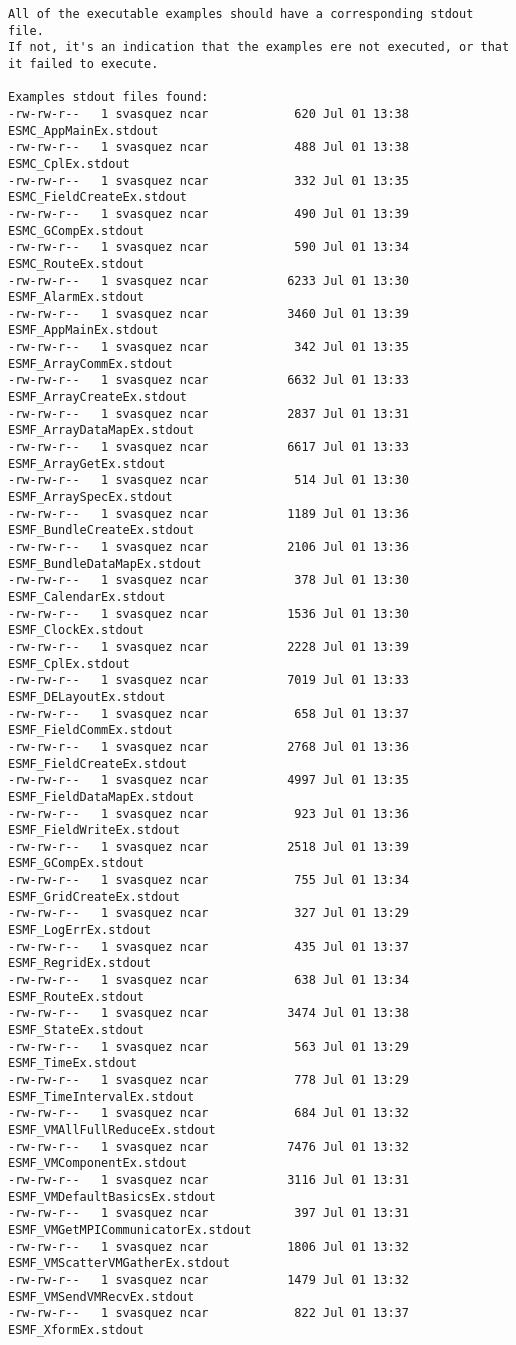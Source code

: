 \begin{verbatim}
All of the executable examples should have a corresponding stdout file.
If not, it's an indication that the examples ere not executed, or that it failed to execute.

Examples stdout files found: 
-rw-rw-r--   1 svasquez ncar            620 Jul 01 13:38 ESMC_AppMainEx.stdout
-rw-rw-r--   1 svasquez ncar            488 Jul 01 13:38 ESMC_CplEx.stdout
-rw-rw-r--   1 svasquez ncar            332 Jul 01 13:35 ESMC_FieldCreateEx.stdout
-rw-rw-r--   1 svasquez ncar            490 Jul 01 13:39 ESMC_GCompEx.stdout
-rw-rw-r--   1 svasquez ncar            590 Jul 01 13:34 ESMC_RouteEx.stdout
-rw-rw-r--   1 svasquez ncar           6233 Jul 01 13:30 ESMF_AlarmEx.stdout
-rw-rw-r--   1 svasquez ncar           3460 Jul 01 13:39 ESMF_AppMainEx.stdout
-rw-rw-r--   1 svasquez ncar            342 Jul 01 13:35 ESMF_ArrayCommEx.stdout
-rw-rw-r--   1 svasquez ncar           6632 Jul 01 13:33 ESMF_ArrayCreateEx.stdout
-rw-rw-r--   1 svasquez ncar           2837 Jul 01 13:31 ESMF_ArrayDataMapEx.stdout
-rw-rw-r--   1 svasquez ncar           6617 Jul 01 13:33 ESMF_ArrayGetEx.stdout
-rw-rw-r--   1 svasquez ncar            514 Jul 01 13:30 ESMF_ArraySpecEx.stdout
-rw-rw-r--   1 svasquez ncar           1189 Jul 01 13:36 ESMF_BundleCreateEx.stdout
-rw-rw-r--   1 svasquez ncar           2106 Jul 01 13:36 ESMF_BundleDataMapEx.stdout
-rw-rw-r--   1 svasquez ncar            378 Jul 01 13:30 ESMF_CalendarEx.stdout
-rw-rw-r--   1 svasquez ncar           1536 Jul 01 13:30 ESMF_ClockEx.stdout
-rw-rw-r--   1 svasquez ncar           2228 Jul 01 13:39 ESMF_CplEx.stdout
-rw-rw-r--   1 svasquez ncar           7019 Jul 01 13:33 ESMF_DELayoutEx.stdout
-rw-rw-r--   1 svasquez ncar            658 Jul 01 13:37 ESMF_FieldCommEx.stdout
-rw-rw-r--   1 svasquez ncar           2768 Jul 01 13:36 ESMF_FieldCreateEx.stdout
-rw-rw-r--   1 svasquez ncar           4997 Jul 01 13:35 ESMF_FieldDataMapEx.stdout
-rw-rw-r--   1 svasquez ncar            923 Jul 01 13:36 ESMF_FieldWriteEx.stdout
-rw-rw-r--   1 svasquez ncar           2518 Jul 01 13:39 ESMF_GCompEx.stdout
-rw-rw-r--   1 svasquez ncar            755 Jul 01 13:34 ESMF_GridCreateEx.stdout
-rw-rw-r--   1 svasquez ncar            327 Jul 01 13:29 ESMF_LogErrEx.stdout
-rw-rw-r--   1 svasquez ncar            435 Jul 01 13:37 ESMF_RegridEx.stdout
-rw-rw-r--   1 svasquez ncar            638 Jul 01 13:34 ESMF_RouteEx.stdout
-rw-rw-r--   1 svasquez ncar           3474 Jul 01 13:38 ESMF_StateEx.stdout
-rw-rw-r--   1 svasquez ncar            563 Jul 01 13:29 ESMF_TimeEx.stdout
-rw-rw-r--   1 svasquez ncar            778 Jul 01 13:29 ESMF_TimeIntervalEx.stdout
-rw-rw-r--   1 svasquez ncar            684 Jul 01 13:32 ESMF_VMAllFullReduceEx.stdout
-rw-rw-r--   1 svasquez ncar           7476 Jul 01 13:32 ESMF_VMComponentEx.stdout
-rw-rw-r--   1 svasquez ncar           3116 Jul 01 13:31 ESMF_VMDefaultBasicsEx.stdout
-rw-rw-r--   1 svasquez ncar            397 Jul 01 13:31 ESMF_VMGetMPICommunicatorEx.stdout
-rw-rw-r--   1 svasquez ncar           1806 Jul 01 13:32 ESMF_VMScatterVMGatherEx.stdout
-rw-rw-r--   1 svasquez ncar           1479 Jul 01 13:32 ESMF_VMSendVMRecvEx.stdout
-rw-rw-r--   1 svasquez ncar            822 Jul 01 13:37 ESMF_XformEx.stdout


\end{verbatim}
